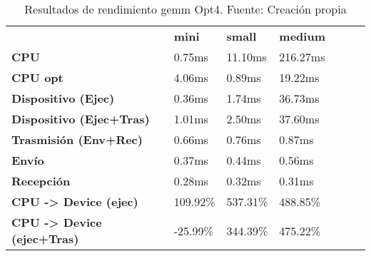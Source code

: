 \begin{table}[H]
    \centering
    \begin{tabular}{lllllll}
    \rowcolor[HTML]{DAE8FC} \ &  \textbf{mini} &  \textbf{	small} &  \textbf{	medium} \\
    \cellcolor[HTML]{DAE8FC} \textbf{CPU} & 0.75ms & 	11.10ms & 	216.27ms \\
    \rowcolor[HTML]{EFEFEF} \cellcolor[HTML]{DAE8FC} \textbf{CPU opt} & 4.06ms & 	0.89ms & 	19.22ms \\
    \cellcolor[HTML]{DAE8FC} \textbf{Dispositivo (Ejec)} & 0.36ms & 	1.74ms & 	36.73ms \\
    \rowcolor[HTML]{EFEFEF} \cellcolor[HTML]{DAE8FC} \textbf{Dispositivo (Ejec+Tras)} & 1.01ms & 	2.50ms & 	37.60ms \\
    \cellcolor[HTML]{DAE8FC} \textbf{Trasmisión (Env+Rec)} & 0.66ms & 	0.76ms & 	0.87ms \\
    \rowcolor[HTML]{EFEFEF} \cellcolor[HTML]{DAE8FC} \textbf{Envío} & 0.37ms & 	0.44ms & 	0.56ms \\
    \cellcolor[HTML]{DAE8FC} \textbf{Recepción} & 0.28ms & 	0.32ms & 	0.31ms \\
    \rowcolor[HTML]{EFEFEF} \cellcolor[HTML]{DAE8FC} \textbf{CPU -> Device (ejec)} & 109.92\% & 	537.31\% & 	488.85\% \\
    \cellcolor[HTML]{DAE8FC} \textbf{CPU -> Device (ejec+Tras)} & -25.99\% & 	344.39\% & 	475.22\% \\
    \end{tabular}
    \caption[Resultados de rendimiento gemm Opt4]{{Resultados de rendimiento gemm Opt4. Fuente: Creación propia}}
    \label{table_test_gemm_Opt4_hw_performanceResults}
\end{table}